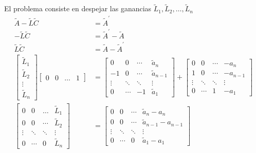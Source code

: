 El problema consiste en despejar las ganancias \( \tilde{L}_{1}, \tilde{L}_{2}, \ldots, \tilde{L}_{n}  \)
\[
    \begin{split}
        \tilde{A} - \tilde{L} \tilde{C} & = \tilde{A}^{'} \\ 
    -\tilde{L} \tilde{C} & = \tilde{A}^{'} - \tilde{A} \\
    \tilde{L} \tilde{C} & = \tilde{A} - \tilde{A}^{'}\\
    \begin{bmatrix}
        \tilde{L}_{1} \\ \tilde{L}_{2} \\ \vdots \\ \tilde{L}_{n}
    \end{bmatrix}
    \begin{bmatrix}
        0 & 0 & \ldots & 1
    \end{bmatrix} & =
    \begin{bmatrix}
        0 & 0 & \cdots & \tilde{a}_{n} \\
        -1 & 0 & \cdots & \tilde{a}_{n-1} \\
        \vdots & \ddots & \ddots & \vdots \\
        0 & \cdots & -1 & \tilde{a}_{1}
    \end{bmatrix}
    +
    \begin{bmatrix}
        0 & 0 & \cdots & -a_{n} \\
        1 & 0 & \cdots & -a_{n-1} \\
        \vdots & \ddots & \ddots & \vdots \\
        0 & \cdots & 1 & -a_{1}
    \end{bmatrix} \\
    \begin{bmatrix}
        0 & 0 & \ldots & \tilde{L}_{1} \\
        0 & 0 & \cdots & \tilde{L}_{2} \\
        \vdots & \ddots & \ddots & \vdots \\
        0 & \cdots & 0 & \tilde{L}_{n}
    \end{bmatrix} 
    & =
    \begin{bmatrix}
        0 & 0 & \cdots & \tilde{a}_{n} - a_{n} \\
        0 & 0 & \cdots & \tilde{a}_{n-1} - a_{n-1} \\
        \vdots & \ddots & \ddots & \vdots \\
        0 & \cdots & 0 & \tilde{a}_{1} - a_{1}
    \end{bmatrix} \\
    \end{split}
\]

